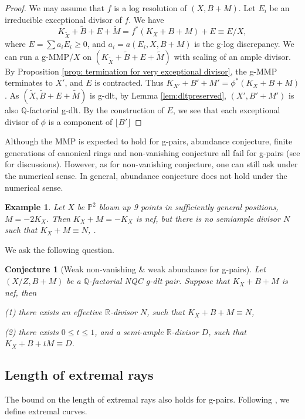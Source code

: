 \documentclass[11pt]{amsart}
\newcommand{\Pp}{\mathbb{P}}
\newcommand{\Rr}{\mathbb{R}}
\newcommand{\Qq}{\mathbb{Q}}
\newcommand{\lf}{\lfloor}
\newtheorem{example}[theorem]{Example}
\newtheorem{conjecture}[theorem]{Conjecture}
\begin{document}
\begin{proof}
	We may assume that $f$ is a log resolution of $(X,B+M)$. Let $E_i$ be an irreducible exceptional divisor of $f$. We have
\[
K_{\tilde{X}}+\tilde{B}+E+\tilde{M}=f^*(K_{X}+B+M)+E\equiv E/X,
\] where $E=\sum a_iE_i\ge0 $, and $a_i=a(E_i, X, B+M)$ is the g-log discrepancy. We can run a g-MMP$/X$ on $(K_{\tilde{X}}+\tilde{B}+E+\tilde{M})$ with scaling of an ample divisor. By Proposition \ref{prop: termination for very exceptional divisor}, the g-MMP terminates to $X'$, and $E$ is contracted. Thus $K_{X'}+B'+M'=\phi^*(K_{X}+B+M)$. As $(\tilde{X}, \tilde{B}+E+\tilde{M})$ is g-dlt, by Lemma \ref{lem:dltpreserved}, $(X', B' + M')$ is also $\Qq$-factorial g-dlt. By the construction of $E$, we see that each exceptional divisor of $\phi$ is a component of $\lf B'\rfloor$
\end{proof}

Although the MMP is expected to hold for g-pairs, abundance conjecture, finite generations of canonical rings and non-vanishing conjecture all fail for g-pairs (see \cite[\S 3]{Birkarhuweak14} for discussions). However, as for non-vanishing conjecture, one can still ask under the numerical sense. In general, abundance conjecture does not hold under the numerical sense.
\begin{example}
	Let $X$ be $\Pp^2$ blown up 9 points in sufficiently general positions, $M=-2K_X$. Then $K_X+M=-K_X$ is nef, but there is no semiample divisor $N$ such that $K_X+M\equiv N$,  \cite{bauer2004}. 
\end{example}
We ask the following question.
\begin{conjecture}[Weak non-vanishing \& weak abundance for g-pairs]
	Let $(X/Z,B+M)$ be a $\Qq$-factorial NQC g-dlt pair. Suppose that $K_X+B+M$ is nef, then 
	
	(1) there exists an effective $\Rr$-divisor $N$, such that $K_X+B+M\equiv N$,
	
	(2) there exists $0\le t\le 1$, and a semi-ample $\Rr$-divisor $D$, such that $K_X+B+tM\equiv D$.
\end{conjecture} 


\subsection{Length of extremal rays}\label{subsection: length of extremal rays and its applications}

The bound on the length of extremal rays also holds for g-pairs. Following \cite[Definition 1]{Sho09}, we define extremal curves.
\end{document}
